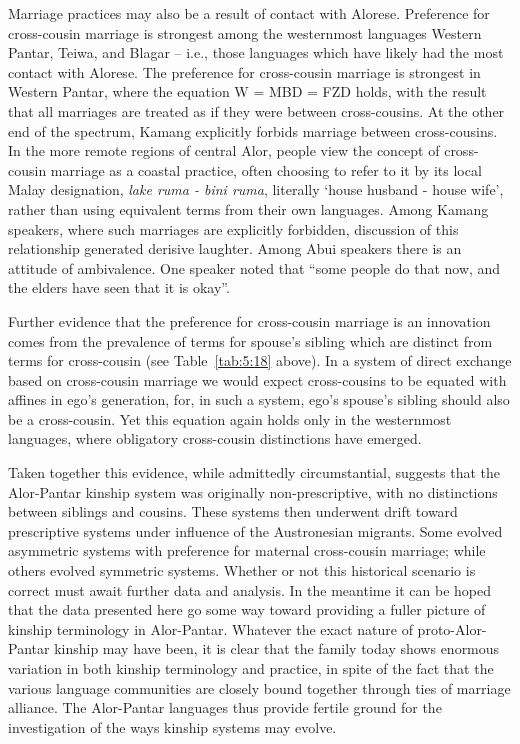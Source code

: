 Marriage practices may also be a result of contact with Alorese. Preference for cross-cousin marriage is strongest among the westernmost languages Western Pantar, Teiwa, and Blagar -- i.e., those languages which have likely had the most contact with Alorese. The preference for cross-cousin marriage is strongest in Western Pantar, where the equation W = MBD = FZD holds, with the result that all marriages are treated as if they were between cross-cousins. At the other end of the spectrum, Kamang explicitly forbids marriage between cross-cousins. In the more remote regions of central Alor, people view the concept of cross-cousin marriage as a coastal practice, often choosing to refer to it by its local Malay designation, \textit{lake ruma - bini ruma}, literally `house husband - house wife', rather than using equivalent terms from their own languages. Among Kamang speakers, where such marriages are explicitly forbidden, discussion of this relationship generated derisive laughter. Among Abui speakers there is an attitude of ambivalence. One speaker noted that ``some people do that now, and the elders have seen that it is okay''. 

Further evidence that the preference for cross-cousin marriage is an innovation comes from the prevalence of terms for spouse's  sibling which are distinct from terms for cross-cousin (see Table~\ref{tab:5:18} above). In a system of direct exchange based on cross-cousin marriage we would expect cross-cousins to be equated with affines in ego's generation, for, in such a system, ego's spouse's sibling should also be a cross-cousin. Yet this equation again holds only in the westernmost languages, where obligatory cross-cousin distinctions have emerged. 

Taken together this evidence, while admittedly circumstantial, suggests that the Alor-Pantar kinship system was originally non-prescriptive, with no distinctions between siblings and cousins. These systems then underwent drift toward prescriptive systems under influence of the Austronesian migrants. Some evolved asymmetric systems with preference for maternal cross-cousin marriage; while others evolved symmetric systems. Whether or not this historical scenario is correct must await further data and analysis. In the meantime it can be hoped that the data presented here go some way toward providing a fuller picture of kinship terminology in Alor-Pantar. Whatever the exact nature of proto-Alor-Pantar kinship may have been, it is clear that the family today shows enormous variation in both kinship terminology and practice, in spite of the fact that the various language communities are closely bound together through ties of marriage alliance. The Alor-Pantar languages thus provide fertile ground for the investigation of the ways kinship systems may evolve.

